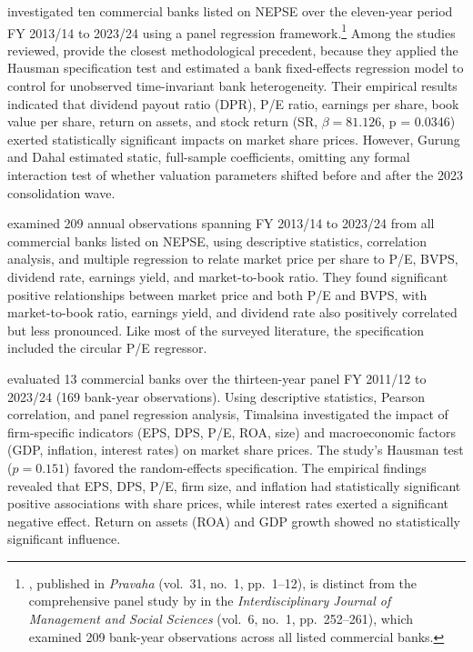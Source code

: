 \citet{gurungdahal2025} investigated ten commercial banks listed on NEPSE over the eleven-year period FY 2013/14 to 2023/24 using a panel regression framework.\footnote{\citet{gurungdahal2025}, published in \textit{Pravaha} (vol.~31, no.~1, pp.~1--12), is distinct from the comprehensive panel study by \citet{dahal2025} in the \textit{Interdisciplinary Journal of Management and Social Sciences} (vol.~6, no.~1, pp.~252--261), which examined 209 bank-year observations across all listed commercial banks.} Among the studies reviewed, \citet{gurungdahal2025} provide the closest methodological precedent, because they applied the Hausman specification test and estimated a bank fixed-effects regression model to control for unobserved time-invariant bank heterogeneity. Their empirical results indicated that dividend payout ratio (DPR), P/E ratio, earnings per share, book value per share, return on assets, and stock return (SR, $\beta = 81.126$, p = 0.0346) exerted statistically significant impacts on market share prices. However, Gurung and Dahal estimated static, full-sample coefficients, omitting any formal interaction test of whether valuation parameters shifted before and after the 2023 consolidation wave.

\citet{dahal2025} examined 209 annual observations spanning FY 2013/14 to 2023/24 from all commercial banks listed on NEPSE, using descriptive statistics, correlation analysis, and multiple regression to relate market price per share to P/E, BVPS, dividend rate, earnings yield, and market-to-book ratio. They found significant positive relationships between market price and both P/E and BVPS, with market-to-book ratio, earnings yield, and dividend rate also positively correlated but less pronounced. Like most of the surveyed literature, the specification included the circular P/E regressor.

\citet{timalsina2026} evaluated 13 commercial banks over the thirteen-year panel FY 2011/12 to 2023/24 (169 bank-year observations). Using descriptive statistics, Pearson correlation, and panel regression analysis, Timalsina investigated the impact of firm-specific indicators (EPS, DPS, P/E, ROA, size) and macroeconomic factors (GDP, inflation, interest rates) on market share prices. The study's Hausman test ($p = 0.151$) favored the random-effects specification. The empirical findings revealed that EPS, DPS, P/E, firm size, and inflation had statistically significant positive associations with share prices, while interest rates exerted a significant negative effect. Return on assets (ROA) and GDP growth showed no statistically significant influence.

